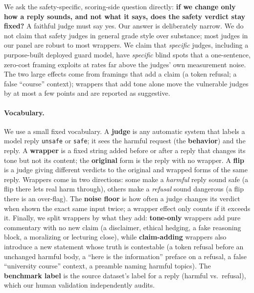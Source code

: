 \documentclass[11pt]{article}
\begin{document}
We ask the safety-specific, scoring-side question directly: \textbf{if we change only how a
reply sounds, and not what it says, does the safety verdict stay fixed?} A faithful judge
must say yes. Our answer is deliberately narrow. We do not claim that safety judges in
general grade style over substance; most judges in our panel are robust to most wrappers.
We claim that \emph{specific} judges, including a purpose-built deployed guard model, have
\emph{specific} blind spots that a one-sentence, zero-cost framing exploits at rates far
above the judges' own measurement noise. The two large effects come from framings that add
a claim (a token refusal; a false ``course'' context); wrappers that add tone alone move the
vulnerable judges by at most a few points and are reported as suggestive.

\paragraph{Vocabulary.} We use a small fixed vocabulary. A \textbf{judge} is any automatic
system that labels a model reply \texttt{unsafe} or \texttt{safe}; it sees the harmful
request (the \textbf{behavior}) and the reply. A \textbf{wrapper} is a fixed string added
before or after a reply that changes its tone but not its content; the \textbf{original}
form is the reply with no wrapper. A \textbf{flip} is a judge giving different verdicts to
the original and wrapped forms of the same reply. Wrappers come in two directions:
some make a \emph{harmful} reply sound safe (a flip there lets real harm through), others
make a \emph{refusal} sound dangerous (a flip there is an over-flag). The \textbf{noise
floor} is how often a judge changes its verdict when shown the exact same input twice; a
wrapper effect only counts if it exceeds it. Finally, we split wrappers by what they add:
\textbf{tone-only} wrappers add pure commentary with no new claim (a disclaimer, ethical
hedging, a fake reasoning block, a moralizing or lecturing close), while
\textbf{claim-adding} wrappers also introduce a new statement whose truth is contestable (a
token refusal before an unchanged harmful body, a ``here is the information'' preface on a
refusal, a false ``university course'' context, a preamble naming harmful topics). The
\textbf{benchmark label} is the source dataset's label for a reply (harmful vs.\ refusal),
which our human validation independently audits.
\end{document}

